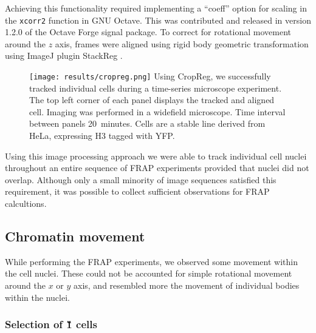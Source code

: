       Achieving this functionality required implementing a ``coeff'' option
      for scaling in the \texttt{xcorr2} function in GNU Octave.
      This was contributed and released in version 1.2.0 of the Octave Forge signal package.
      To correct for rotational movement around the $z$ axis,
      frames were aligned using rigid body geometric transformation using ImageJ plugin StackReg \citep{stackreg}.

      \begin{figure}
        \centering
        \texttt{[image: results/cropreg.png]}
          {
            Using CropReg, we successfully tracked individual cells during
            a time-series microscope experiment. The top left corner of each
            panel displays the tracked and aligned cell. Imaging was performed
            in a widefield microscope. Time interval between panels 20~minutes.
            Cells are a stable line derived from HeLa, expressing H3 tagged
            with YFP.
          }
        \label{fig:kill-frap:cropreg}
      \end{figure}

      Using this image processing approach we were able to track individual cell nuclei
      throughout an entire sequence of FRAP experiments  provided
      that nuclei did not overlap.
      Although only a small minority of image sequences satisfied this requirement,
      it was possible to collect sufficient observations for FRAP calcultions.

  \subsection{Chromatin movement}

    While performing the FRAP experiments, we observed some movement
    within the cell nuclei. These could not be accounted for simple rotational
    movement around the $x$ or $y$ axis, and resembled more the movement
    of individual bodies within the nuclei.

    \subsubsection{Selection of \G1{} cells}

